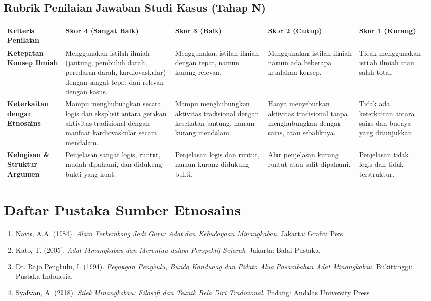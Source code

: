 \documentclass[a4paper,12pt]{article}
\begin{document}
\subsection{Rubrik Penilaian Jawaban Studi Kasus (Tahap N)}

\begin{longtable}{|p{3cm}|p{3cm}|p{3cm}|p{3cm}|p{3cm}|}
\hline
\textbf{Kriteria Penilaian} & \textbf{Skor 4 (Sangat Baik)} & \textbf{Skor 3 (Baik)} & \textbf{Skor 2 (Cukup)} & \textbf{Skor 1 (Kurang)} \\
\hline
\textbf{Ketepatan Konsep Ilmiah} & Menggunakan istilah ilmiah (jantung, pembuluh darah, peredaran darah, kardiovaskular) dengan sangat tepat dan relevan dengan kasus. & Menggunakan istilah ilmiah dengan tepat, namun kurang relevan. & Menggunakan istilah ilmiah namun ada beberapa kesalahan konsep. & Tidak menggunakan istilah ilmiah atau salah total. \\
\hline
\textbf{Keterkaitan dengan Etnosains} & Mampu menghubungkan secara logis dan eksplisit antara gerakan aktivitas tradisional dengan manfaat kardiovaskular secara mendalam. & Mampu menghubungkan aktivitas tradisional dengan kesehatan jantung, namun kurang mendalam. & Hanya menyebutkan aktivitas tradisional tanpa menghubungkan dengan sains, atau sebaliknya. & Tidak ada keterkaitan antara sains dan budaya yang ditunjukkan. \\
\hline
\textbf{Kelogisan \& Struktur Argumen} & Penjelasan sangat logis, runtut, mudah dipahami, dan didukung bukti yang kuat. & Penjelasan logis dan runtut, namun kurang didukung bukti. & Alur penjelasan kurang runtut atau sulit dipahami. & Penjelasan tidak logis dan tidak terstruktur. \\
\hline
\end{longtable}

\section{Daftar Pustaka Sumber Etnosains}

\begin{enumerate}
\item Navis, A.A. (1984). \textit{Alam Terkembang Jadi Guru: Adat dan Kebudayaan Minangkabau}. Jakarta: Grafiti Pers.
\item Kato, T. (2005). \textit{Adat Minangkabau dan Merantau dalam Perspektif Sejarah}. Jakarta: Balai Pustaka.
\item Dt. Rajo Penghulu, I. (1994). \textit{Pegangan Penghulu, Bundo Kanduang dan Pidato Alua Pasambahan Adat Minangkabau}. Bukittinggi: Pustaka Indonesia.
\item Syafwan, A. (2018). \textit{Silek Minangkabau: Filosofi dan Teknik Bela Diri Tradisional}. Padang: Andalas University Press.
\end{enumerate}
\end{document}
